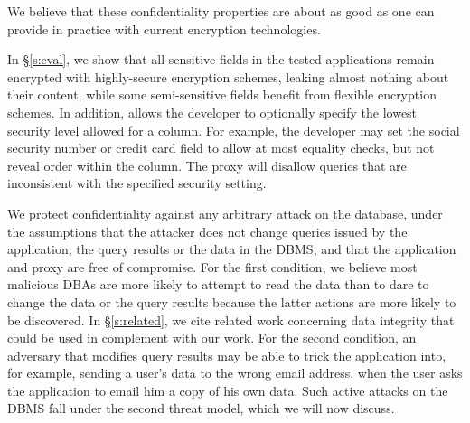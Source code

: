 We believe that these confidentiality properties are about as good as
one can provide in practice with current encryption technologies.



In \S\ref{s:eval}, we show that all sensitive fields in the tested
applications remain encrypted with highly-secure encryption schemes, 
leaking almost nothing about their content, while some 
semi-sensitive fields benefit from flexible encryption schemes.
  In addition, \name{}
allows the developer to optionally specify the lowest security level
allowed for a column.  For example, the developer may set the social
security number or credit card field to allow at most equality checks,
but not reveal order within the column.  The proxy will disallow
queries that are inconsistent with the specified security setting.



We protect confidentiality against any arbitrary attack on the
database, under the assumptions that the attacker does not change
queries issued by the application, the query results or the data in
the DBMS, and that the application and proxy are free of compromise.
For the first condition, we believe most malicious DBAs are more
likely to attempt to read the data than to dare to change the data or
the query results because the latter actions are more likely to be
discovered. In \S\ref{s:related}, we cite related work concerning data
integrity that could be used in complement with our work.  For the
second condition, an adversary that modifies query results may be able
to trick the application into, for example, sending a user's data to
the wrong email address, when the user asks the application to email
him a copy of his own data.  Such active attacks on the DBMS fall
under the second threat model, which we will now discuss.

